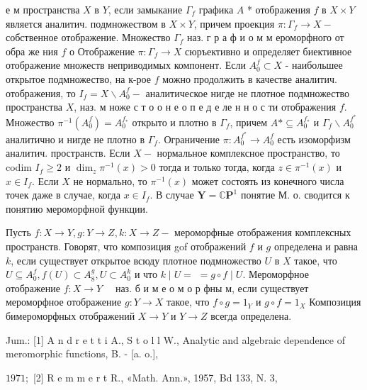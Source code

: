 \documentclass[10pt]{article}
\begin{document}
е м пространства $X$ в $Y$, если замыкание $\Gamma_{f}$ графика $A$ * отображения $f$ в $X \times Y$ является аналитич. подмножеством в $X \times Y$, причем проекция $\pi: \Gamma_{f} \rightarrow X-$ собственное отображение. Множество $\Gamma_{f}$ наз. г р а ф и о м м ероморфного от обра же ния $f$ о Отображение $\pi: \Gamma_{f} \rightarrow X$ сюръективно и определяет биективное отображение множеств неприводимых компонент. Если $A_{0}^{f} \subset X$ - наибольшее открытое подмножество, на к-рое $f$ можно продолжить в качестве аналитич. отображения, то $I_{f}=X \backslash A_{0}^{f}-$ аналитическое нигде не плотное подмножество пространства $X$, наз. м ноже с т о о н е о п е д е ле н н о с ти отображения $f$. Множество $\pi^{-1}\left(A_{0}^{f}\right)=A_{0}^{f_{*}}$ открыто и плотно в $\Gamma_{f}$, причем $A * \subseteq A_{0}^{f_{*}}$ и $\Gamma_{f} \backslash A_{0}^{f^{*}}$ аналитично и нигде не плотно в $\Gamma_{f}$. Ограничение $\pi: A_{0}^{f^{*}} \rightarrow A_{0}^{f}$ есть изоморфизм аналитич. пространств. Если $X-$ нормальное комплексное пространство, то codim $I_{f} \geqslant 2$ и $\operatorname{dim}_{z} \pi^{-1}(x)>0$ тогда и только тогда, когда $z \in \pi^{-1}(x)$ и $x \in I_{f}$. Если $X$ не нормально, то $\pi^{-1}(x)$ может состоять из конечного числа точек даже в случае, когда $x \in I_{f}$. В случае $\boldsymbol{Y}=\mathbb{C} \boldsymbol{P}^{1}$ понятие М. о. сводится к понятию мероморфной функции.



Пусть $f: X \rightarrow Y, g: Y \rightarrow Z, k: X \rightarrow Z-$ мероморфные отображения комплексных пространств. Говорят, что композиция gof отображений $f$ и $g$ определена и равна $k$, если существует открытое всюду плотное подмножество $U$ в $X$ такое, что $U \subseteq A_{0}^{f}, f(U) \subset A_{8}^{g}, U \subset A_{0}^{k}$ и что $k \mid U=$ $=g \circ f \mid U$. Мероморфное отображение $f: X \rightarrow Y \quad$ наз. б и м е о м о р фны м, если существует мероморфное отображение $g: Y \rightarrow X$ такое, что $f \circ g=1_{Y}$ и $g \circ f=1_{X}$ Композиция бимероморфных отображений $X \rightarrow Y$ и $Y \rightarrow Z$ всегда определена.



Jum.: [1] A n d r e t t i A., S t o l l W., Analytic and algebraic dependence of meromorphic functions, B. - [a. o.],

$1971 ;$ [2] R e m m e r t R., «Math. Ann.», 1957, Bd 133, N. 3,
\end{document}
